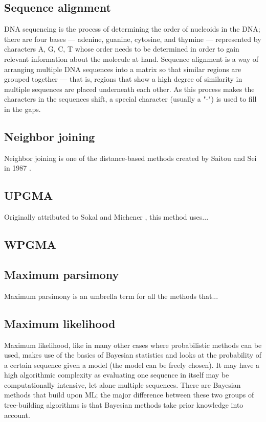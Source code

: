 \documentclass[11pt,twocolumn]{article}
\begin{document}
\subsection*{Sequence alignment}

DNA sequencing is the process of determining the order of nucleoids in the DNA; there are four bases — adenine, guanine, cytosine, and thymine — represented by characters A, G, C, T whose order needs to be determined in order to gain relevant information about the molecule at hand. Sequence alignment is a way of arranging multiple DNA sequences into a matrix so that similar regions are grouped together — that is, regions that show a high degree of similarity in multiple sequences are placed underneath each other. As this process makes the characters in the sequences shift, a special character (usually a "-") is used to fill in the gaps.

\subsection*{Neighbor joining}

Neighbor joining is one of the distance-based methods created by Saitou and Sei in 1987 \cite{1987}.

\subsection*{UPGMA}

Originally attributed to Sokal and Michener \cite{sokal58}, this method uses... 

\subsection*{WPGMA}

\subsection*{Maximum parsimony}

Maximum parsimony is an umbrella term for all the methods that... %

\subsection*{Maximum likelihood}

Maximum likelihood, like in many other cases where probabilistic methods can be used, makes use of the basics of Bayesian statistics and looks at the probability of a certain sequence given a model (the model can be freely chosen). It may have a high algorithmic complexity as evaluating one sequence in itself may be computationally intensive, let alone multiple sequences. There are Bayesian methods that build upon ML; the major difference between these two groups of tree-building algorithms is that Bayesian methods take prior knowledge into account.
\end{document}
